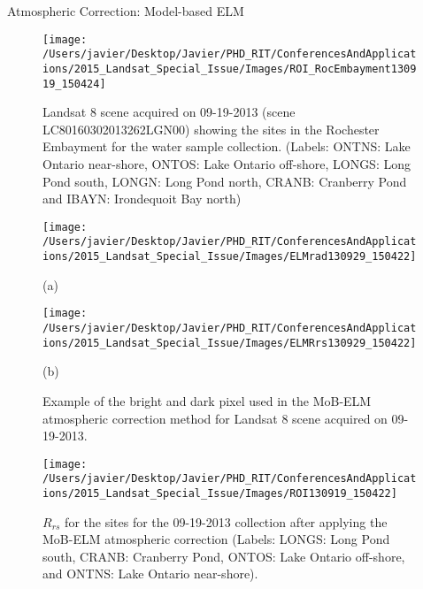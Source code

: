 \documentclass[mathserif]{beamer}
\begin{document}
\begin{frame}{}
\begin{columns}[t]
\begin{column}{.3\linewidth}
\begin{block}{Atmospheric Correction: Model-based ELM}
\begin{figure}[htb]
  \centering
  \texttt{[image: /Users/javier/Desktop/Javier/PHD\_RIT/ConferencesAndApplications/2015\_Landsat\_Special\_Issue/Images/ROI\_RocEmbayment130919\_150424]}
  \caption{Landsat 8 scene acquired on 09-19-2013 (scene LC80160302013262LGN00) showing the sites in the Rochester Embayment for the water sample collection. (Labels: ONTNS: Lake Ontario near-shore, ONTOS: Lake Ontario off-shore, LONGS: Long Pond south, LONGN: Long Pond north, CRANB: Cranberry Pond and IBAYN: Irondequoit Bay north)\label{fig:091913Sites} } 
\end{figure}

\begin{figure}[htb]
  \begin{minipage}[c]{0.40\linewidth}
    \centering
      \texttt{[image: /Users/javier/Desktop/Javier/PHD\_RIT/ConferencesAndApplications/2015\_Landsat\_Special\_Issue/Images/ELMrad130929\_150422]}\\
    \centerline{(a)}\medskip
  \end{minipage}
  \hspace{1cm}
  \begin{minipage}[d]{0.40\linewidth}
    \centering
      \texttt{[image: /Users/javier/Desktop/Javier/PHD\_RIT/ConferencesAndApplications/2015\_Landsat\_Special\_Issue/Images/ELMRrs130929\_150422]}\\
    \centerline{(b)}\medskip
  \end{minipage}
  \caption{Example of the bright and dark pixel used in the MoB-ELM atmospheric correction method for Landsat 8 scene acquired on 09-19-2013.\label{fig:MOBELMpxls} } 
\end{figure}

\begin{figure}[htbp!]
  \centering
  \texttt{[image: /Users/javier/Desktop/Javier/PHD\_RIT/ConferencesAndApplications/2015\_Landsat\_Special\_Issue/Images/ROI130919\_150422]}
  \caption{$R_{rs}$ for the sites for the 09-19-2013 collection after applying the MoB-ELM atmospheric correction (Labels: LONGS: Long Pond south, CRANB: Cranberry Pond, ONTOS: Lake Ontario off-shore, and ONTNS: Lake Ontario near-shore).\label{fig:RrsROIs130919} } 
\end{figure}
\vspace{-.2cm}
\end{block}



\end{column}
\end{columns}
\end{frame}
\end{document}
